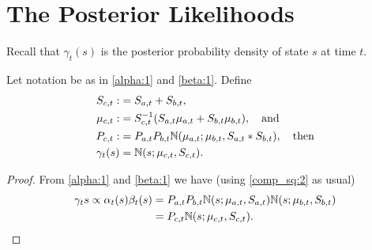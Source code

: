 \documentclass[12pt,leqno]{article}
\begin{document}
\section{The Posterior Likelihoods}
Recall that $\gamma_t(s)$ is the posterior probability density of state $s$
at time $t$. 
\begin{Thm}
  Let notation be as in \eqref{alpha:1} and \eqref{beta:1}.  Define
\begin{align*}
  S_{c,t} :&= S_{a,t} + S_{b,t}, \\
  \mu_{c,t} :&= S_{c,t}^{-1}(S_{a,t}\mu_{a,t} + S_{b,t}\mu_{b,t}), \quad\text{and}\\
  P_{c,t} :&= P_{a,t}P_{b,t}{\mathbb N}(\mu_{a,t};\mu_{b,t},S_{a,t}*S_{b,t}), \quad\text{then} \\
 \gamma_t(s) &= {\mathbb N}(s;\mu_{c,t},S_{c,t}).
  \end{align*}
\end{Thm}
\begin{proof}
  From \eqref{alpha:1} and \eqref{beta:1} we have (using \eqref{comp_sq:2}
  as usual)
  \begin{align*}
  \gamma_t{s} \propto \alpha_t(s)\beta_t(s) &= P_{a,t}P_{b,t}{\mathbb N}(s;\mu_{a,t},S_{a,t}){\mathbb N}(s;\mu_{b,t},S_{b,t})\\
  &= P_{c,t}{\mathbb N}(s;\mu_{c,t},S_{c,t}).
  \end{align*}
\end{proof}
\end{document}
